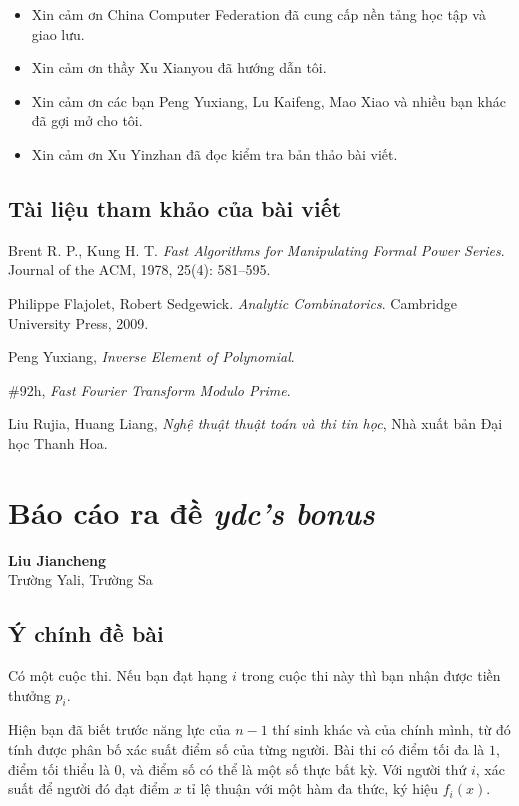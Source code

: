 \documentclass[11pt]{article}
\begin{document}
\begin{itemize}
  \item Xin cảm ơn China Computer Federation đã cung cấp nền tảng học tập và
  giao lưu.
  \item Xin cảm ơn thầy Xu Xianyou đã hướng dẫn tôi.
  \item Xin cảm ơn các bạn Peng Yuxiang, Lu Kaifeng, Mao Xiao và nhiều bạn khác
  đã gợi mở cho tôi.
  \item Xin cảm ơn Xu Yinzhan đã đọc kiểm tra bản thảo bài viết.
\end{itemize}

\subsection*{Tài liệu tham khảo của bài viết}

\begin{enumerate}[label={[\arabic*]},leftmargin=3em]
  \item Brent R. P., Kung H. T. \emph{Fast Algorithms for Manipulating Formal
  Power Series}. Journal of the ACM, 1978, 25(4): 581--595.
  \item Philippe Flajolet, Robert Sedgewick. \emph{Analytic Combinatorics}.
  Cambridge University Press, 2009.
  \item Peng Yuxiang, \emph{Inverse Element of Polynomial}.
  \item \#92h, \emph{Fast Fourier Transform Modulo Prime}.
  \item Liu Rujia, Huang Liang, \emph{Nghệ thuật thuật toán và thi tin học},
  Nhà xuất bản Đại học Thanh Hoa.
\end{enumerate}

\section{Báo cáo ra đề \emph{ydc's bonus}}

\begin{center}
\textbf{Liu Jiancheng}\\
Trường Yali, Trường Sa
\end{center}

\subsection{Ý chính đề bài}

Có một cuộc thi. Nếu bạn đạt hạng \(i\) trong cuộc thi này thì bạn nhận được
tiền thưởng \(p_i\).

Hiện bạn đã biết trước năng lực của \(n-1\) thí sinh khác và của chính mình, từ
đó tính được phân bố xác suất điểm số của từng người. Bài thi có điểm tối đa là
\(1\), điểm tối thiểu là \(0\), và điểm số có thể là một số thực bất kỳ. Với
người thứ \(i\), xác suất để người đó đạt điểm \(x\) tỉ lệ thuận với một hàm
đa thức, ký hiệu \(f_i(x)\).
\end{document}
